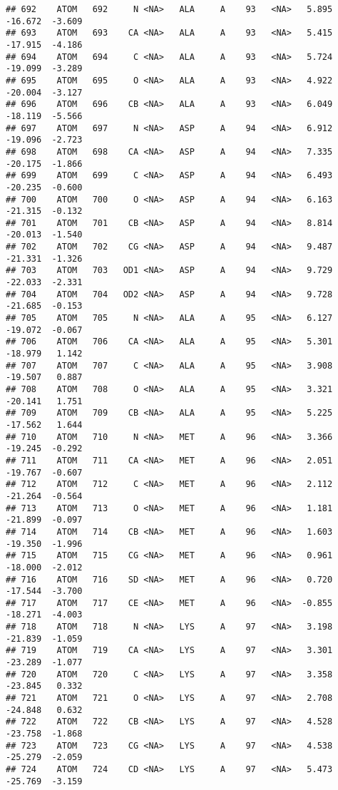 \documentclass[
]{article}
\begin{document}
\begin{verbatim}
## 692    ATOM   692     N <NA>   ALA     A    93   <NA>   5.895 -16.672  -3.609
## 693    ATOM   693    CA <NA>   ALA     A    93   <NA>   5.415 -17.915  -4.186
## 694    ATOM   694     C <NA>   ALA     A    93   <NA>   5.724 -19.099  -3.289
## 695    ATOM   695     O <NA>   ALA     A    93   <NA>   4.922 -20.004  -3.127
## 696    ATOM   696    CB <NA>   ALA     A    93   <NA>   6.049 -18.119  -5.566
## 697    ATOM   697     N <NA>   ASP     A    94   <NA>   6.912 -19.096  -2.723
## 698    ATOM   698    CA <NA>   ASP     A    94   <NA>   7.335 -20.175  -1.866
## 699    ATOM   699     C <NA>   ASP     A    94   <NA>   6.493 -20.235  -0.600
## 700    ATOM   700     O <NA>   ASP     A    94   <NA>   6.163 -21.315  -0.132
## 701    ATOM   701    CB <NA>   ASP     A    94   <NA>   8.814 -20.013  -1.540
## 702    ATOM   702    CG <NA>   ASP     A    94   <NA>   9.487 -21.331  -1.326
## 703    ATOM   703   OD1 <NA>   ASP     A    94   <NA>   9.729 -22.033  -2.331
## 704    ATOM   704   OD2 <NA>   ASP     A    94   <NA>   9.728 -21.685  -0.153
## 705    ATOM   705     N <NA>   ALA     A    95   <NA>   6.127 -19.072  -0.067
## 706    ATOM   706    CA <NA>   ALA     A    95   <NA>   5.301 -18.979   1.142
## 707    ATOM   707     C <NA>   ALA     A    95   <NA>   3.908 -19.507   0.887
## 708    ATOM   708     O <NA>   ALA     A    95   <NA>   3.321 -20.141   1.751
## 709    ATOM   709    CB <NA>   ALA     A    95   <NA>   5.225 -17.562   1.644
## 710    ATOM   710     N <NA>   MET     A    96   <NA>   3.366 -19.245  -0.292
## 711    ATOM   711    CA <NA>   MET     A    96   <NA>   2.051 -19.767  -0.607
## 712    ATOM   712     C <NA>   MET     A    96   <NA>   2.112 -21.264  -0.564
## 713    ATOM   713     O <NA>   MET     A    96   <NA>   1.181 -21.899  -0.097
## 714    ATOM   714    CB <NA>   MET     A    96   <NA>   1.603 -19.350  -1.996
## 715    ATOM   715    CG <NA>   MET     A    96   <NA>   0.961 -18.000  -2.012
## 716    ATOM   716    SD <NA>   MET     A    96   <NA>   0.720 -17.544  -3.700
## 717    ATOM   717    CE <NA>   MET     A    96   <NA>  -0.855 -18.271  -4.003
## 718    ATOM   718     N <NA>   LYS     A    97   <NA>   3.198 -21.839  -1.059
## 719    ATOM   719    CA <NA>   LYS     A    97   <NA>   3.301 -23.289  -1.077
## 720    ATOM   720     C <NA>   LYS     A    97   <NA>   3.358 -23.845   0.332
## 721    ATOM   721     O <NA>   LYS     A    97   <NA>   2.708 -24.848   0.632
## 722    ATOM   722    CB <NA>   LYS     A    97   <NA>   4.528 -23.758  -1.868
## 723    ATOM   723    CG <NA>   LYS     A    97   <NA>   4.538 -25.279  -2.059
## 724    ATOM   724    CD <NA>   LYS     A    97   <NA>   5.473 -25.769  -3.159

\end{verbatim}
\end{document}
